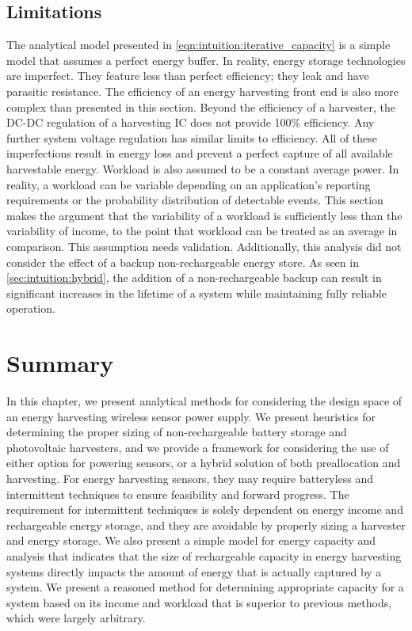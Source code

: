 \subsection{Limitations}
The analytical model presented in \cref{eqn:intuition:iterative_capacity} is a simple model that assumes a perfect energy buffer. In reality, energy storage technologies are imperfect. They feature less than perfect efficiency; they leak and have parasitic resistance. 
The efficiency of an energy harvesting front end is also more complex than presented in this section.
Beyond the efficiency of a harvester, the DC-DC regulation of a harvesting IC does not provide 100\% efficiency. 
Any further system voltage regulation has similar limits to efficiency. 
All of these imperfections result in energy loss and prevent a perfect capture of all available harvestable energy.
Workload is also assumed to be a constant average power. In reality, a workload can be variable depending on an application's reporting requirements or the probability distribution of detectable events.
This section makes the argument that the variability of a workload is sufficiently less than the variability of income, to the point that workload can be treated as an average in comparison. This assumption needs validation.
Additionally, this analysis did not consider the effect of a backup non-rechargeable energy store. As seen in \cref{sec:intuition:hybrid}, the addition of a non-rechargeable backup can result in significant increases in the lifetime of a system while maintaining fully reliable operation.


\section{Summary}
In this chapter, we present analytical methods for considering the design space of an energy harvesting wireless sensor power supply.
We present heuristics for determining the proper sizing of non-rechargeable battery storage and photovoltaic harvesters, and we provide a framework for considering the use of either option for powering sensors, or a hybrid solution of both preallocation and harvesting.
For energy harvesting sensors, they may require batteryless and intermittent techniques to ensure feasibility and forward progress. 
The requirement for intermittent techniques is solely dependent on energy income and rechargeable energy storage, and they are avoidable by properly sizing a harvester and energy storage.
We also present a simple model for energy capacity and analysis that indicates that the size of rechargeable capacity in energy harvesting systems directly impacts the amount of energy that is actually captured by a system.
We present a reasoned method for determining appropriate capacity for a system based on its income and workload that is superior to previous methods, which were largely arbitrary.

